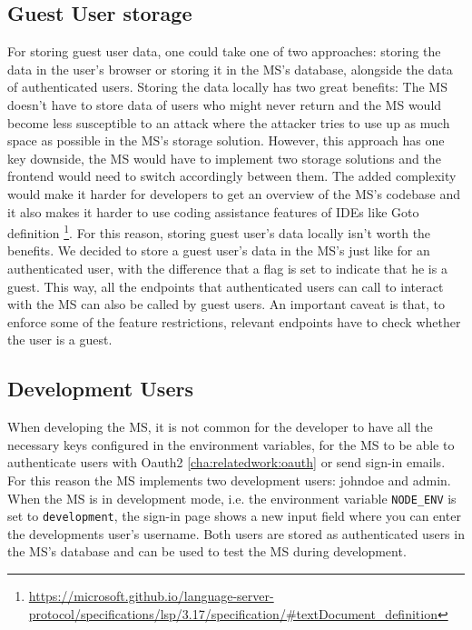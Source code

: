 \subsection{Guest User storage}

For storing guest user data, one could take one of two approaches:
storing the data in the user's browser or storing it in the MS's database, alongside the
data of authenticated users.
Storing the data locally has two great benefits: 
The MS doesn't have to store data of users who might never return and
the MS would become less susceptible to an attack where the attacker tries to use up as
much space as possible in the MS's storage solution.
However, this approach has one key downside, the MS would have to implement two storage
solutions and the frontend would need to switch accordingly between them.
The added complexity would make it harder for developers to get an overview of the MS's
codebase and it also makes it harder to use coding assistance features of IDEs like Goto
definition \footnote{\url{https://microsoft.github.io/language-server-protocol/specifications/lsp/3.17/specification/\#textDocument_definition}}.
For this reason, storing guest user's data locally isn't worth the benefits.
We decided to store a guest user's data in the MS's just like for an authenticated user,
with the difference that a flag is set to indicate that he is a guest.
This way, all the endpoints that authenticated users can call to interact with the MS
can also be called by guest users.
An important caveat is that, to enforce some of the feature restrictions, relevant
endpoints have to check whether the user is a guest.

\subsection{Development Users}

When developing the MS, it is not common for the developer to have all the necessary keys
configured in the environment variables, for the MS to be able to authenticate users with
Oauth2 \ref{cha:relatedwork:oauth} or send sign-in emails.
For this reason the MS implements two development users: johndoe and admin.
When the MS is in development mode, i.e. the environment variable \lstinline{NODE_ENV} is
set to \lstinline{development},
the sign-in page shows a new input field where you can enter the developments user's username.
Both users are stored as authenticated users in the MS's database and can be used to test
the MS during development.


